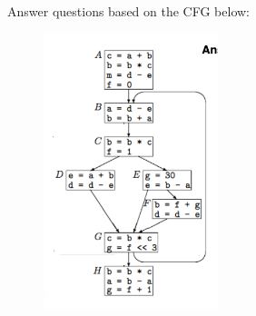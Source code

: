 \documentclass[11pt]{article}
\begin{document}
\section{}

Answer questions based on the CFG below:
\begin{figure}[H]
    \centerline{\includegraphics[width=2in]{figures/hw1_cfg1.png}}
\end{figure}
\end{document}
